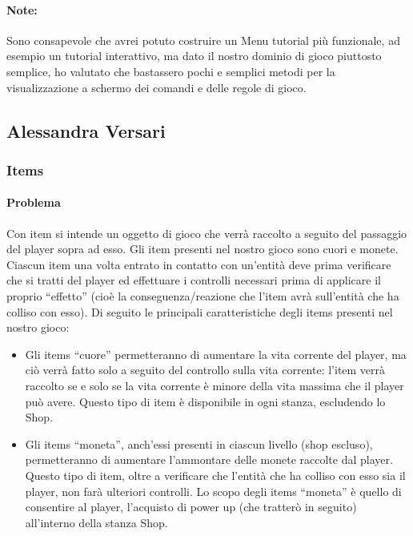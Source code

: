 \documentclass[a4paper,12pt]{report}
\begin{document}
\paragraph*{Note:}
Sono consapevole che avrei potuto costruire un Menu tutorial più funzionale, ad esempio un tutorial interattivo, ma dato il nostro dominio di 
gioco piuttosto semplice, ho valutato che bastassero pochi e semplici metodi per la visualizzazione a schermo dei comandi e delle regole di gioco.

\subsection{Alessandra Versari}
\subsubsection*{Items}
\paragraph*{Problema}
	Con item si intende un oggetto di gioco che verrà raccolto a seguito del passaggio del player sopra ad esso. Gli item presenti nel nostro gioco sono cuori e monete.
	Ciascun item una volta entrato in contatto con un'entità deve prima verificare che si tratti del player ed effettuare i controlli necessari prima di applicare il proprio “effetto” (cioè la conseguenza/reazione che l'item avrà sull'entità che ha colliso con esso).
	Di seguito le principali caratteristiche degli items presenti nel nostro gioco:
	\begin{itemize}
		\item Gli items “cuore” permetteranno di aumentare la vita corrente del player, ma ciò verrà fatto solo a seguito del controllo sulla vita corrente: l'item verrà raccolto se e solo se la vita corrente è minore della vita massima che il player può avere. Questo tipo di item è disponibile in ogni stanza, escludendo lo Shop.
		\item Gli items “moneta”, anch'essi presenti in ciascun livello (shop escluso), permetteranno di aumentare l'ammontare delle monete raccolte dal player. Questo tipo di item, oltre a verificare che l'entità che ha colliso con esso sia il player, non farà ulteriori controlli. Lo scopo degli items “moneta” è quello di consentire al player, l'acquisto di power up (che tratterò in seguito) all'interno della stanza Shop.
	\end{itemize}
\end{document}
